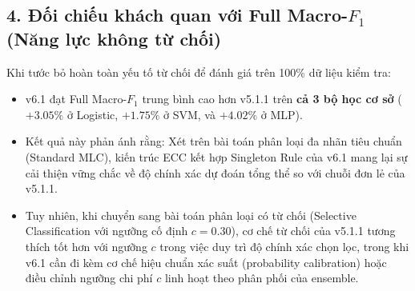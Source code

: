 \documentclass[11pt,a4paper]{article}
\begin{document}
\subsection{4. Đối chiếu khách quan với Full Macro-\texorpdfstring{$F_1$}{F1} (Năng lực không từ chối)}
Khi tước bỏ hoàn toàn yếu tố từ chối để đánh giá trên 100\% dữ liệu kiểm tra:
\begin{itemize}
    \item v6.1 đạt Full Macro-$F_1$ trung bình cao hơn v5.1.1 trên \textbf{cả 3 bộ học cơ sở} ($+3.05\%$ ở Logistic, $+1.75\%$ ở SVM, và $+4.02\%$ ở MLP).
    \item Kết quả này phản ánh rằng: Xét trên bài toán phân loại đa nhãn tiêu chuẩn (Standard MLC), kiến trúc ECC kết hợp Singleton Rule của v6.1 mang lại sự cải thiện vững chắc về độ chính xác dự đoán tổng thể so với chuỗi đơn lẻ của v5.1.1.
    \item Tuy nhiên, khi chuyển sang bài toán phân loại có từ chối (Selective Classification với ngưỡng cố định $c = 0.30$), cơ chế từ chối của v5.1.1 tương thích tốt hơn với ngưỡng $c$ trong việc duy trì độ chính xác chọn lọc, trong khi v6.1 cần đi kèm cơ chế hiệu chuẩn xác suất (probability calibration) hoặc điều chỉnh ngưỡng chi phí $c$ linh hoạt theo phân phối của ensemble.
\end{itemize}
\end{document}
